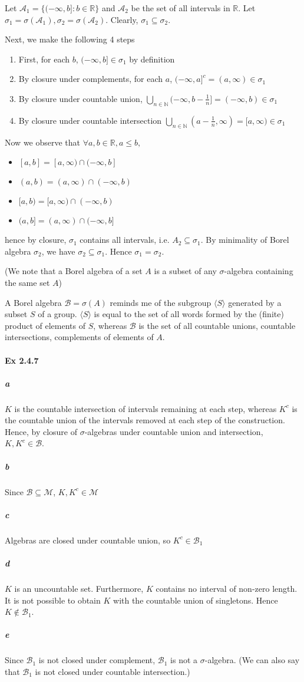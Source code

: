 \documentclass[a4paper]{article}
\newcommand{\borel}[0]{\mathcal{B}} %
\newcommand{\measure}[0]{\mathcal{M}}
\begin{document}
Let $\mathcal{A_1} = \{(-\infty, b] : b\in \mathbb{R}\}$ and $\mathcal{A_2}$ be the set of all intervals in $\mathbb{R}$. Let $\sigma_1 = \sigma(\mathcal{A_1}), \sigma_2 = \sigma(\mathcal{A_2})$. Clearly, $\sigma_1\subseteq\sigma_2$.

Next, we make the following 4 steps
\begin{enumerate}
	\item First, for each $b$, $(-\infty, b]\in \sigma_1$ by definition
	\item By closure under complements, for each $a$, $(-\infty, a]^c = (a, \infty)\in\sigma_1$
	\item By closure under countable union, $\bigcup_{n\in \mathbb{N}}(-\infty,b-\frac{1}{n}] = (-\infty, b)\in\sigma_1$
	\item By closure under countable intersection $\bigcup_{n\in \mathbb{N}}(a-\frac{1}{n}, \infty) = [a, \infty)\in\sigma_1$
\end{enumerate}
Now we observe that $\forall a,b\in\mathbb{R},a\leq b,$
\begin{itemize}
	\item $[a,b] = [a, \infty)\cap (-\infty, b]$
	\item $(a,b) = (a, \infty)\cap (-\infty, b)$
	\item $[a,b) = [a, \infty)\cap (-\infty, b)$
	\item $(a,b] = (a, \infty)\cap (-\infty, b]$
\end{itemize}
hence by closure, $\sigma_1$ contains all intervals, i.e. $A_2\subseteq \sigma_1$. By minimality of Borel algebra $\sigma_2$, we have $\sigma_2\subseteq\sigma_1$. Hence $\sigma_1=\sigma_2$.

(We note that a Borel algebra of a set $A$ is a subset of any $\sigma$-algebra containing the same set $A$)

A Borel algebra $\borel = \sigma(A)$ reminds me of the subgroup $\langle S\rangle$ generated by a subset $S$ of a group. $\langle S\rangle$ is equal to the set of all words formed by the (finite) product of elements of $S$, whereas $\borel$ is the set of all countable unions, countable intersections, complements of elements of $A$.

\paragraph{Ex 2.4.7}
\subparagraph{a} $K$ is the countable intersection of intervals remaining at each step, whereas $K^c$ is the countable union of the intervals removed at each step of the construction. Hence, by closure of $\sigma$-algebras under countable union and intersection, $K, K^c\in \borel$.
\subparagraph{b} Since $\borel\subseteq\measure$, $K,K^c\in\measure$
\subparagraph{c} Algebras are closed under countable union, so $K^c\in \mathcal{B}_1$
\subparagraph{d} $K$ is an uncountable set. Furthermore, $K$ contains no interval of non-zero length. It is not possible to obtain $K$ with the countable union of singletons. Hence $K\notin \borel_1$.
\subparagraph{e} Since $\borel_1$ is not closed under complement, $\borel_1$ is not a $\sigma$-algebra. (We can also say that $\borel_1$ is not closed under countable intersection.)
\end{document}
